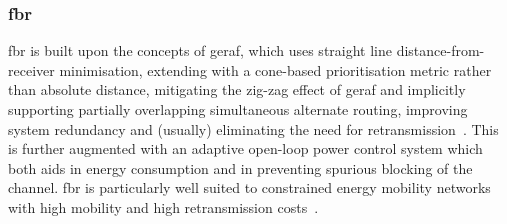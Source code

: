 {\subsubsection{\gls{fbr}}
\gls{fbr} is built upon the concepts of \gls{geraf}, which uses straight line distance-from-receiver minimisation, extending with a cone-based prioritisation metric rather than absolute distance, mitigating the zig-zag effect of \gls{geraf} and implicitly supporting partially overlapping simultaneous alternate routing, improving system redundancy and (usually) eliminating the need for retransmission~\cite{Jornet2008}.
This is further augmented with an adaptive open-loop power control system which both aids in energy consumption and in preventing spurious blocking of the channel.
\gls{fbr} is particularly well suited to constrained energy mobility networks with high mobility and high retransmission costs~\cite{Noh2012}.

}

